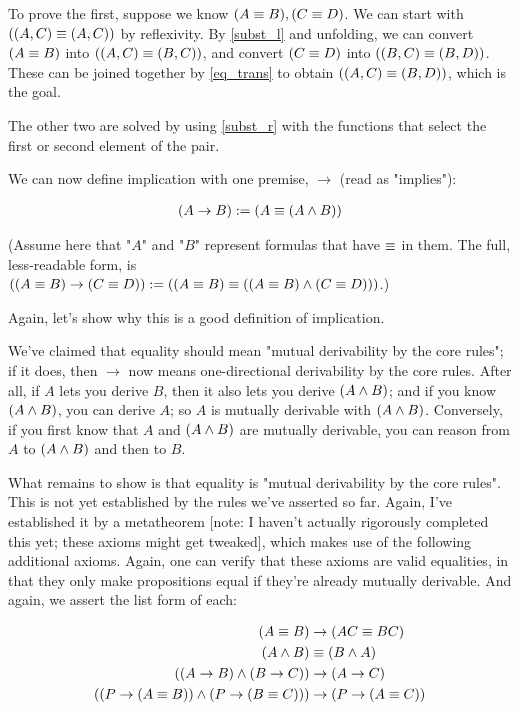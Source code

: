 \documentclass{article}
\begin{document}
  To prove the first, suppose we know $(A \equiv B), (C \equiv D)$. We can start with $((A,C) \equiv (A,C))$ by reflexivity. By \eqref{subst_l} and unfolding, we can convert $(A \equiv B)$ into $((A,C) \equiv (B,C))$, and convert $(C \equiv D)$ into $((B,C) \equiv (B,D))$. These can be joined together by \eqref{eq_trans} to obtain $((A,C) \equiv (B,D))$, which is the goal.
  
  The other two are solved by using \eqref{subst_r} with the functions that select the first or second element of the pair.
  
  We can now define implication with one premise, $\to$ (read as "implies"):
  
  \begin{align*}
    (A \to B) := (A \equiv (A \wedge B))
  \end{align*}
  
  (Assume here that "$A$" and "$B$" represent formulas that have $\equiv$ in them. The full, less-readable form, is $((A \equiv B) \to (C \equiv D)):= ((A \equiv B) \equiv ((A \equiv B) \wedge (C \equiv D)))$.)
  
  Again, let's show why this is a good definition of implication.
  
  We've claimed that equality should mean "mutual derivability by the core rules"; if it does, then $\to$ now means one-directional derivability by the core rules.
  After all, if $A$ lets you derive $B$, then it also lets you derive $(A \wedge B)$; and if you know $(A \wedge B)$, you can derive $A$; so $A$ is mutually derivable with $(A \wedge B)$.
  Conversely, if you first know that $A$ and $(A \wedge B)$ are mutually derivable, you can reason from $A$ to $(A \wedge B)$ and then to $B$.
  
  What remains to show is that equality is "mutual derivability by the core rules". This is not yet established by the rules we've asserted so far. Again, I've established it by a metatheorem [note: I haven't actually rigorously completed this yet; these axioms might get tweaked], which makes use of the following additional axioms. Again, one can verify that these axioms are valid equalities, in that they only make propositions equal if they're already mutually derivable. And again, we assert the list form of each:
  
  \begin{align*}
    (A \equiv B) &\to (AC \equiv BC)\\
    (A \wedge B) &\equiv (B \wedge A)\\
    ((A \to B) \wedge (B \to C)) &\to (A \to C)\\
    ((P \to (A \equiv B)) \wedge (P \to (B \equiv C))) &\to (P \to (A \equiv C))\\
  \end{align*}
  
\end{document}
